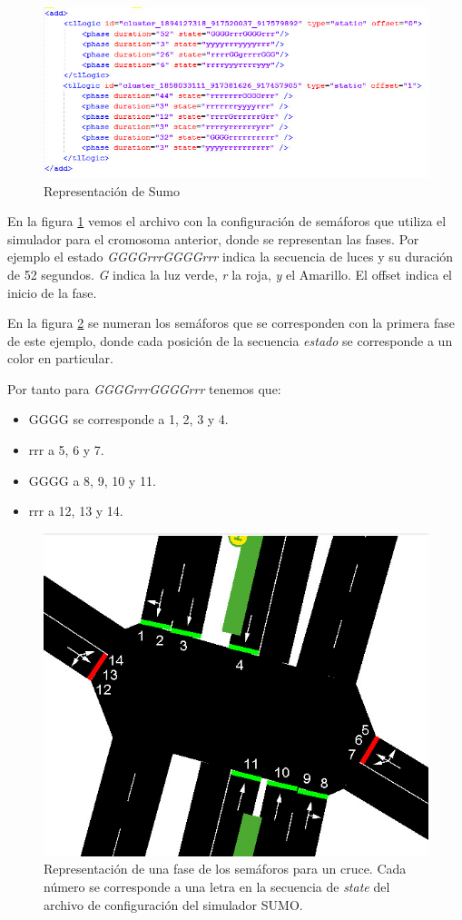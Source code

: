 \begin{figure}[H]
	\centering
	\includegraphics[width=\linewidth]{Figures/rep_sumo2}
	\caption{Representación de Sumo}
	\label{fig:rep_sumo}
\end{figure}

En la figura \ref{fig:rep_sumo} vemos el archivo con la configuración de semáforos que utiliza el simulador para el cromosoma anterior, donde se representan las fases. Por ejemplo el estado \emph{GGGGrrrGGGGrrr} indica la secuencia de luces y su duración de 52 segundos. \emph{G} indica la luz verde, \emph{r} la roja, \emph{y} el Amarillo. El offset indica el inicio de la fase. 

En la figura \ref{fig:sem_numerados} se numeran los semáforos que se corresponden con la primera fase de este ejemplo, donde cada posición de la secuencia \emph{estado} se corresponde a un color en particular. 


Por tanto para \emph{GGGGrrrGGGGrrr} tenemos que:
\begin{itemize}
\item GGGG se corresponde a 1, 2, 3 y 4. 
\item rrr a 5, 6 y 7. 
\item GGGG a 8, 9, 10 y 11. 
\item rrr a 12, 13 y 14. 
\end{itemize}
  




\begin{figure}[H]
	\centering
	\includegraphics[width=0.7\linewidth]{Figures/semaforos_numerado}
	\caption{Representación de una fase de los semáforos para un cruce. Cada número se corresponde a una letra en la secuencia de \emph{state} del archivo de configuración del simulador SUMO.}
	\label{fig:sem_numerados}
\end{figure}

